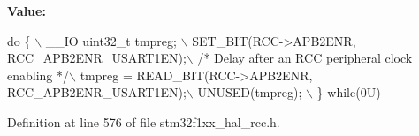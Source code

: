 {\bfseries Value\+:}
\begin{DoxyCode}
\textcolor{keywordflow}{do} \{ \(\backslash\)
                                        \_\_IO uint32\_t tmpreg; \(\backslash\)
                                        SET\_BIT(RCC->APB2ENR, RCC\_APB2ENR\_USART1EN);\(\backslash\)
                                        \textcolor{comment}{/* Delay after an RCC peripheral clock enabling */}\(\backslash\)
                                        tmpreg = READ\_BIT(RCC->APB2ENR, RCC\_APB2ENR\_USART1EN);\(\backslash\)
                                        UNUSED(tmpreg); \(\backslash\)
                                      \} \textcolor{keywordflow}{while}(0U)
\end{DoxyCode}


Definition at line 576 of file stm32f1xx\+\_\+hal\+\_\+rcc.\+h.

